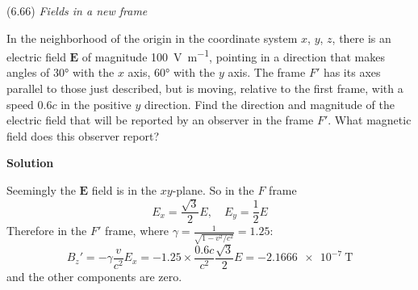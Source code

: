 \documentclass{article}
\begin{document}
\begin{homeworkProblem}
	(6.66) \textit{Fields in a new frame}

	In the neighborhood of the origin in the coordinate system $x$, $y$, $z$, there is an electric field $\mathbf{E}$ of magnitude \SI{100}{\volt\per\m}, pointing in a direction that makes angles of \ang{30} with the $x$ axis, \ang{60} with the $y$ axis. The frame $F'$ has its axes parallel to those just described, but is moving, relative to the first frame, with a speed $0.6c$ in the positive $y$ direction. Find the direction and magnitude of the electric field that will be reported by an observer in the frame $F'$. What magnetic field does this observer report?

	\textbf{Solution}

	Seemingly the $\mathbf{E}$ field is in the $xy$-plane. So in the $F$ frame
	\[
		E_x=\frac{\sqrt{3}}{2}E,\quad E_y=\frac{1}{2}E
	\]
	Therefore in the $F'$ frame, where $\gamma=\frac{1}{\sqrt{1-v^2/c^2}}=1.25$:
	\[
		{B_z}'=-\gamma\frac{v}{c^2}E_x=-1.25\times\frac{0.6c}{c^2}\frac{\sqrt{3}}{2}E=\SI{-2.1666e-7}{\tesla}
	\]
	and the other components are zero.
\end{homeworkProblem}

\end{document}

